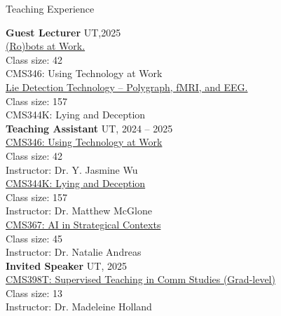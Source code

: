 \documentclass[
	11pt, %
]{resume} %
\begin{document}

\begin{rSection}{Teaching Experience}

    \textbf{Guest Lecturer} \hfill UT,2025\\ 
    \underline{(Ro)bots at Work.}\\ 
    \textbullet\enspace  Class size: 42\\
    \textbullet\enspace  CMS346: Using Technology at Work\\
    
    \underline{Lie Detection Technology – Polygraph, fMRI, and EEG.} \\
     \textbullet\enspace  Class size: 157\\
     \textbullet\enspace CMS344K: Lying and Deception\\
     
    \textbf{Teaching Assistant} \hfill UT, 2024 -- 2025 \\ 
    \underline{CMS346: Using Technology at Work}\\  
    \textbullet\enspace  Class size: 42\\
    \textbullet\enspace  Instructor: Dr. Y. Jasmine Wu\\
    
    \underline{CMS344K: Lying and Deception}\\
    \textbullet\enspace  Class size: 157\\
     \textbullet\enspace  Instructor: Dr. Matthew McGlone\\
     
    \underline{CMS367:  AI in Strategical Contexts}\\
    \textbullet\enspace  Class size: 45\\
    \textbullet\enspace  Instructor: Dr. Natalie Andreas\\


    \textbf{Invited Speaker} \hfill UT, 2025 \\ 
    \underline{CMS398T: Supervised Teaching in Comm Studies (Grad-level)}\\
     \textbullet\enspace  Class size: 13\\
     \textbullet\enspace  Instructor: Dr. Madeleine Holland\\



\end{rSection}
\end{document}
